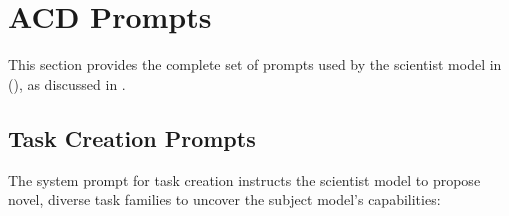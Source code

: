 \section{ACD Prompts}
\label{appsec:prompts}

This section provides the complete set of prompts used by the scientist model in \ouralgolong (\ouralgo), as discussed in .

\subsection{Task Creation Prompts}
\label{appsubsec:task_creation_prompts}

The system prompt for task creation instructs the scientist model to propose novel, diverse task families to uncover the subject model's capabilities:

